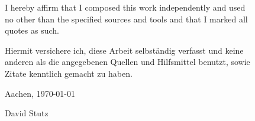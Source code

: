 \pagestyle{fancyplain}

\begin{figure}
I hereby affirm that I composed this work independently and used no other than the specified sources and tools and
that I marked all quotes as such.
\bigskip

Hiermit versichere ich, diese Arbeit selbst\"andig verfasst und keine anderen als die angegebenen Quellen und
Hilfsmittel benutzt, sowie Zitate kenntlich gemacht zu haben.
\medskip

\begin{flushright}
Aachen, \today

\vspace{1.5cm}
\small
David Stutz
\end{flushright}
\end{figure}